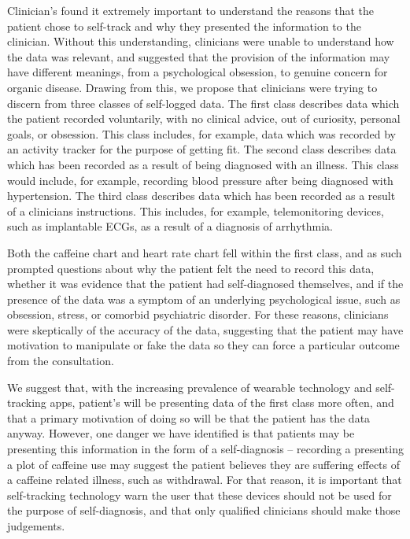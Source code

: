 \documentclass{sigchi}
\begin{document}

%

Clinician's found it extremely important to understand the reasons that the patient chose to self-track and why they presented the information to the clinician. Without this understanding, clinicians were unable to understand how the data was relevant, and suggested that the provision of the information may have different meanings, from a psychological obsession, to genuine concern for organic disease. Drawing from this, we propose that clinicians were trying to discern from three classes of self-logged data. The first class describes data which the patient recorded voluntarily, with no clinical advice, out of curiosity, personal goals, or obsession. This class includes, for example, data which was recorded by an activity tracker for the purpose of getting fit. The second class describes data which has been recorded as a result of being diagnosed with an illness. This class would include, for example, recording blood pressure after being diagnosed with hypertension. The third class describes data which has been recorded as a result of a clinicians instructions. This includes, for example, telemonitoring devices, such as implantable ECGs, as a result of a diagnosis of arrhythmia.

Both the caffeine chart and heart rate chart fell within the first class, and as such prompted questions about why the patient felt the need to record this data, whether it was evidence that the patient had self-diagnosed themselves, and if the presence of the data was a symptom of an underlying psychological issue, such as obsession, stress, or comorbid psychiatric disorder. For these reasons, clinicians were skeptically of the accuracy of the data, suggesting that the patient may have motivation to manipulate or fake the data so they can force a particular outcome from the consultation.

We suggest that, with the increasing prevalence of wearable technology and self-tracking apps, patient's will be presenting data of the first class more often, and that a primary motivation of doing so will be that the patient has the data anyway. However, one danger we have identified is that patients may be presenting this information in the form of a self-diagnosis -- recording a presenting a plot of caffeine use may suggest the patient believes they are suffering effects of a caffeine related illness, such as withdrawal. For that reason, it is important that self-tracking technology warn the user that these devices should not be used for the purpose of self-diagnosis, and that only qualified clinicians should make those judgements.
\end{document}
